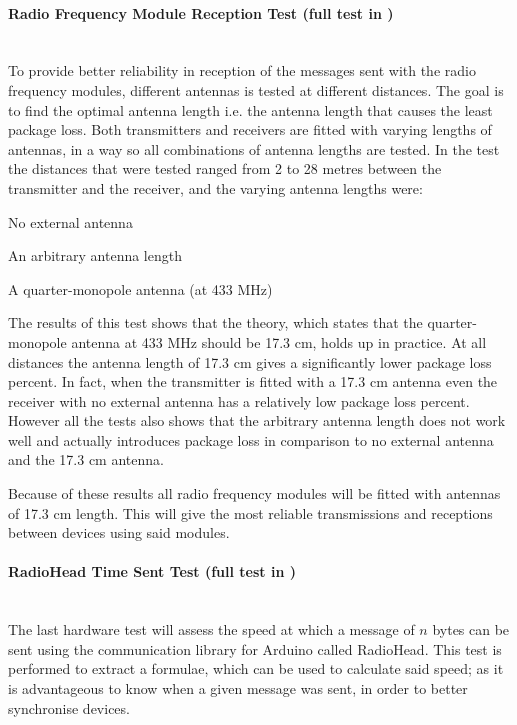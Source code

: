 \paragraph{Radio Frequency Module Reception Test (full test in )} %
\label{par:radio_frequency_module_reception_test}\hfill\\
To provide better reliability in reception of the messages sent with the radio frequency modules, different antennas is tested at different distances.
The goal is to find the optimal antenna length i.e. the antenna length that causes the least package loss.
Both transmitters and receivers are fitted with varying lengths of antennas, in a way so all combinations of antenna lengths are tested. 
In the test the distances that were tested ranged from 2 to 28 metres between the transmitter and the receiver, and the varying antenna lengths were:
\begin{description}[labelindent=\parindent]
    \item[0 cm] No external antenna
    \item[12 cm] An arbitrary antenna length
    \item[17.3 cm] A quarter-monopole antenna (at 433 MHz)
\end{description} 
\noindent
The results of this test shows that the theory, which states that the quarter-monopole antenna at 433 MHz should be 17.3 cm, holds up in practice.
At all distances the antenna length of 17.3 cm gives a significantly lower package loss percent.
In fact, when the transmitter is fitted with a 17.3 cm antenna even the receiver with no external antenna has a relatively low package loss percent.
However all the tests also shows that the arbitrary antenna length does not work well and actually introduces package loss in comparison to no external antenna and the 17.3 cm antenna.

Because of these results all radio frequency modules will be fitted with antennas of 17.3 cm length.
This will give the most reliable transmissions and receptions between devices using said modules.

\paragraph{RadioHead Time Sent Test (full test in )} %
\label{par:radiohead_time_sent_test}\hfill\\
The last hardware test will assess the speed at which a message of $n$ bytes can be sent using the communication library for Arduino called RadioHead.
This test is performed to extract a formulae, which can be used to calculate said speed; as it is advantageous to know when a given message was sent, in order to better synchronise devices.   

